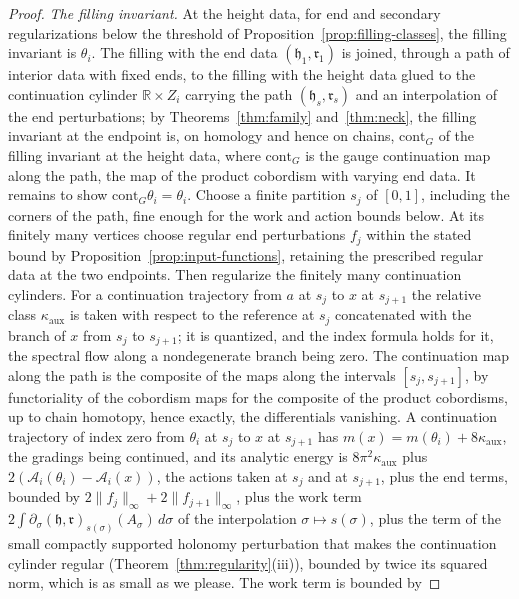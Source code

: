 \documentclass[11pt]{amsart}
\theoremstyle{definition}
\theoremstyle{remark}
\theoremstyle{plain}
\numberwithin{equation}{section}
\newcommand{\RR}{\mathbb{R}}
\begin{document}
\begin{proof}
\emph{The filling invariant.} At the height data, for end and secondary regularizations below
the threshold of Proposition~\ref{prop:filling-classes}, the filling invariant is $\theta_i$.
The filling with the end data
$(\mathfrak h_1,\mathfrak r_1)$ is joined, through a path of interior data with fixed ends, to
the filling with the height data glued to the continuation cylinder $\RR\times Z_i$ carrying the
path $(\mathfrak h_s,\mathfrak r_s)$ and an interpolation of the end perturbations; by
Theorems~\ref{thm:family} and~\ref{thm:neck}, the filling invariant at the endpoint is, on
homology and hence on chains, $\mathrm{cont}_G$ of the filling invariant at the height data,
where $\mathrm{cont}_G$ is the gauge continuation map along the path, the map of the product
cobordism with varying end data. It remains to show $\mathrm{cont}_G\theta_i=\theta_i$.
Choose a finite partition $s_j$ of $[0,1]$, including the corners of the path,
fine enough for the work and action bounds below. At its finitely many vertices
choose regular end perturbations $f_j$ within the stated bound by
Proposition~\ref{prop:input-functions}, retaining the prescribed regular data
at the two endpoints. Then regularize the finitely many continuation cylinders.
For a continuation trajectory from $a$ at $s_j$ to $x$ at $s_{j+1}$ the relative class
$\kappa_{\mathrm{aux}}$ is taken with respect to the reference at $s_j$ concatenated with the
branch of $x$ from $s_j$ to $s_{j+1}$; it is quantized, and the index formula holds for it, the
spectral flow along a nondegenerate branch being zero. The continuation map along the
path is the composite of the maps along the intervals $[s_j,s_{j+1}]$, by functoriality of the
cobordism maps for the composite of the product cobordisms, up to chain homotopy, hence
exactly, the differentials vanishing. A continuation trajectory of index zero from $\theta_i$ at
$s_j$ to $x$ at $s_{j+1}$ has $m(x)=m(\theta_i)+8\kappa_{\mathrm{aux}}$, the gradings being
continued, and its analytic energy is $8\pi^2\kappa_{\mathrm{aux}}$ plus
$2(\mathcal A_i(\theta_i)-\mathcal A_i(x))$, the actions taken at $s_j$ and at $s_{j+1}$, plus
the end terms, bounded by $2\|f_j\|_\infty+2\|f_{j+1}\|_\infty$, plus the work term
$2\int\partial_\sigma(\mathfrak h,\mathfrak r)_{s(\sigma)}(A_\sigma)\,d\sigma$ of the
interpolation $\sigma\mapsto s(\sigma)$, plus the term of the small compactly supported
holonomy perturbation that makes the continuation cylinder regular
(Theorem~\ref{thm:regularity}(iii)), bounded by twice its squared norm, which is as small as we
please. The work term is bounded by

\end{proof}
\end{document}
